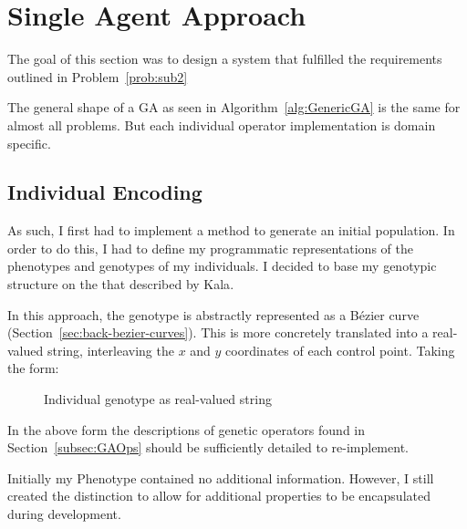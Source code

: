 
\section{Single Agent Approach}

The goal of this section was to design a system that fulfilled the requirements outlined in Problem~\ref{prob:sub2}

The general shape of a GA as seen in Algorithm~\ref{alg:GenericGA} is the same for almost all problems. But each individual operator implementation is domain specific.

\subsection{Individual Encoding}
As such, I first had to implement a method to generate an initial population. In order to do this, I had to define my programmatic representations of the phenotypes and genotypes of my individuals. I decided to base my genotypic structure on the that described by Kala\cite{kalaOnroadIntelligentVehicles2016}.

In this approach, the genotype is abstractly represented as a Bézier curve (Section~\ref{sec:back-bezier-curves}). This is more concretely translated into a real-valued string, interleaving the $x$ and $y$ coordinates of each control point. Taking the form:

\begin{figure}[ht]
	\centering
	\caption{\label{fig:GA_Genotype} Individual genotype as real-valued string }
\end{figure}

In the above form the descriptions of genetic operators found in Section~\ref{subsec:GAOps} should be sufficiently detailed to re-implement.

Initially my Phenotype contained no additional information. However, I still created the distinction to allow for additional properties to be encapsulated during development.

